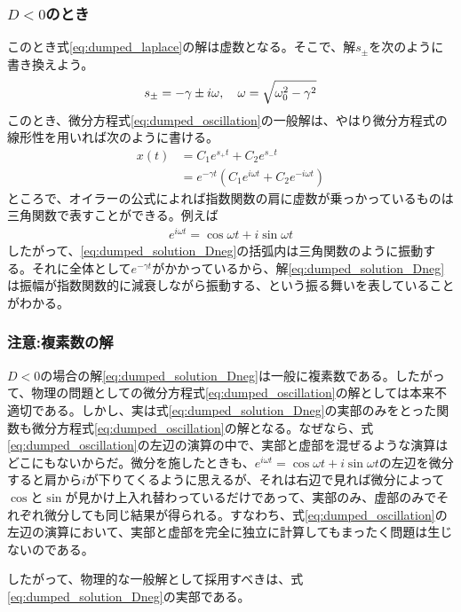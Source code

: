 \documentclass[uplatex,dvipdfmx]{jsarticle}
\begin{document}
\subsubsection{$D<0$のとき}
このとき式\eqref{eq:dumped_laplace}の解は虚数となる。そこで、解$s_\pm$を次のように書き換えよう。
\begin{align}
	s_{\pm} = -\gamma \pm i\omega \qc{\omega = \sqrt{\omega_0^2 - \gamma^2}}	
\end{align}
このとき、微分方程式\eqref{eq:dumped_oscillation}の一般解は、やはり微分方程式の線形性を用いれば次のように書ける。
\begin{align}
	x(t) &= C_1 e^{s_+t} + C_2 e^{s_-t} \nonumber \\
		&= e^{-\gamma t}(C_1 e^{i\omega t} + C_2 e^{-i\omega t}) \label{eq:dumped_solution_Dneg}
\end{align}
ところで、オイラーの公式によれば指数関数の肩に虚数が乗っかっているものは三角関数で表すことができる。例えば
\begin{align}
	e^{i\omega t} = \cos{\omega t} + i\sin{\omega t}
\end{align}
したがって、\eqref{eq:dumped_solution_Dneg}の括弧内は三角関数のように振動する。それに全体として$e^{-\gamma t}$がかかっているから、解\eqref{eq:dumped_solution_Dneg}は振幅が指数関数的に減衰しながら振動する、という振る舞いを表していることがわかる。

\subsubsection{注意:複素数の解} \label{sec:complex_solution}
$D<0$の場合の解\eqref{eq:dumped_solution_Dneg}は一般に複素数である。したがって、物理の問題としての微分方程式\eqref{eq:dumped_oscillation}の解としては本来不適切である。しかし、実は式\eqref{eq:dumped_solution_Dneg}の実部のみをとった関数も微分方程式\eqref{eq:dumped_oscillation}の解となる。なぜなら、式\eqref{eq:dumped_oscillation}の左辺の演算の中で、実部と虚部を混ぜるような演算はどこにもないからだ。微分を施したときも、$e^{i\omega t}=\cos{\omega t} + i\sin{\omega t}$の左辺を微分すると肩から$i$が下りてくるように思えるが、それは右辺で見れば微分によって$\cos$と$\sin$が見かけ上入れ替わっているだけであって、実部のみ、虚部のみでそれぞれ微分しても同じ結果が得られる。すなわち、式\eqref{eq:dumped_oscillation}の左辺の演算において、実部と虚部を完全に独立に計算してもまったく問題は生じないのである。

したがって、物理的な一般解として採用すべきは、式\eqref{eq:dumped_solution_Dneg}の実部である。
\end{document}
